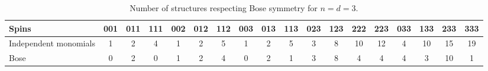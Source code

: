 \documentclass[12pt,a4paper]{extarticle}
\theoremstyle{definition}
\begin{document}
\begin{table}[h]
\centering
\small
\setlength{\tabcolsep}{3.5pt}
\renewcommand{\arraystretch}{1.2}

\begin{tabular}{|p{2cm}|c|c|c|c|c|c|c|c|c|c|c|c|c|c|c|c|c|}
\hline
Spins
& 001 & 011 & 111
& 002 & 012 & 112
& 003 & 013 & 113
& 023 & 123 & 222 & 223
& 033 & 133 & 233 & 333 \\
\hline
Independent monomials& 1 & 2 & 4
& 1 & 2 & 5
& 1 & 2 & 5
& 3 & 8 & 10
& 12 & 4 & 10 & 15 & 19
\\
\hline
Bose & 0 & 2 & 0 & 1 &
2 & 4 & 0 & 2 & 1 &3 & 8 & 4
& 4 & 4 &3 & 10 &1\\
\hline
\end{tabular}

\caption{Number of structures respecting Bose symmetry for $n=d=3$.} \label{table:bose}
\end{table}
\end{document}
